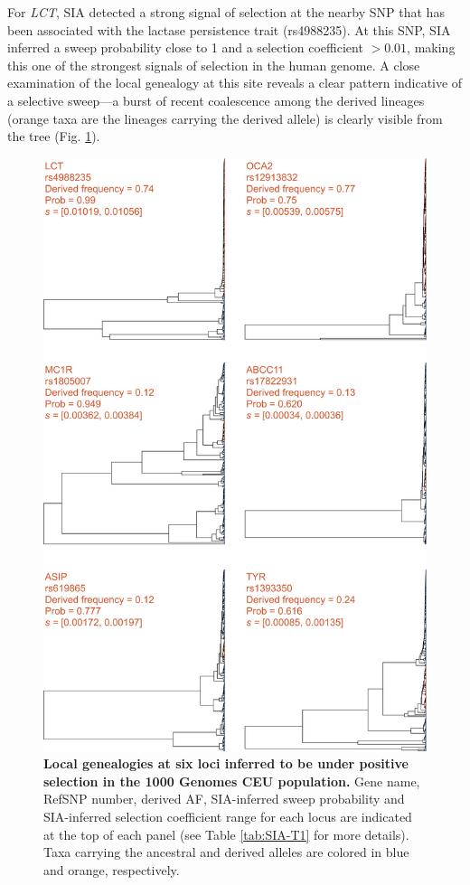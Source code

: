 For \textit{LCT}, \ac{SIA} detected a strong signal of selection at the nearby \acs{SNP} that has been associated with the lactase persistence trait (rs4988235). At this \acs{SNP}, \ac{SIA} inferred a sweep probability close to 1 and a selection coefficient $>0.01$, making this one of the strongest signals of selection in the human genome. A close examination of the local genealogy at this site reveals a clear pattern indicative of a selective sweep––a burst of recent coalescence among the derived lineages (orange taxa are the lineages carrying the derived allele) is clearly visible from the tree (Fig. \ref{fig:SIA-F5}).

\begin{figure}
    \centering
    \includegraphics[scale=0.25]{SIA_figs/SIA_F5.jpeg}
    \caption[Local genealogies at six loci inferred to be under positive selection in the 1000 Genomes CEU population.]{\textbf{Local genealogies at six loci inferred to be under positive selection in the 1000 Genomes CEU population.} Gene name, RefSNP number, derived \ac{AF}, \ac{SIA}-inferred sweep probability and \ac{SIA}-inferred selection coefficient range for each locus are indicated at the top of each panel (see Table \ref{tab:SIA-T1} for more details). Taxa carrying the ancestral and derived alleles are colored in blue and orange, respectively.}
    \label{fig:SIA-F5}
\end{figure}


